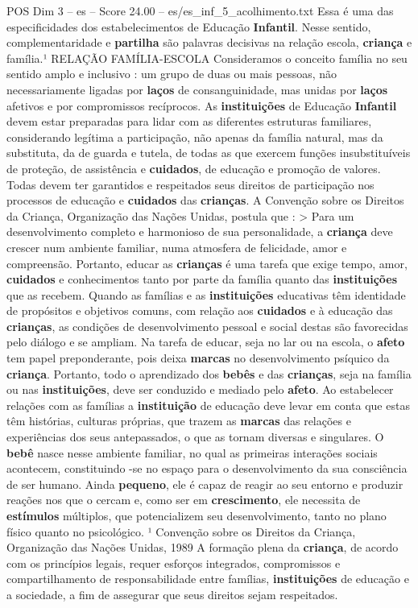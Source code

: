 \begin{textsample}{POS Dim 3 – es – Score 24.00 – es/es\_inf\_5\_acolhimento.txt}
Essa é uma das especificidades dos estabelecimentos de Educação \textbf{Infantil}.
Nesse sentido, complementaridade e \textbf{partilha} são palavras decisivas na relação escola, \textbf{criança} e família.¹ RELAÇÃO FAMÍLIA-ESCOLA Consideramos o conceito família no seu sentido amplo e inclusivo : um grupo de duas ou mais pessoas, não necessariamente ligadas por \textbf{laços} de consanguinidade, mas unidas por \textbf{laços} afetivos e por compromissos recíprocos.
As \textbf{instituições} de Educação \textbf{Infantil} devem estar preparadas para lidar com as diferentes estruturas familiares, considerando legítima a participação, não apenas da família natural, mas da substituta, da de guarda e tutela, de todas as que exercem funções insubstituíveis de proteção, de assistência e \textbf{cuidados}, de educação e promoção de valores.
Todas devem ter garantidos e respeitados seus direitos de participação nos processos de educação e \textbf{cuidados} das \textbf{crianças}.
A Convenção sobre os Direitos da Criança, Organização das Nações Unidas, postula que : > Para um desenvolvimento completo e harmonioso de sua personalidade, a \textbf{criança} deve crescer num ambiente familiar, numa atmosfera de felicidade, amor e compreensão.
Portanto, educar as \textbf{crianças} é uma tarefa que exige tempo, amor, \textbf{cuidados} e conhecimentos tanto por parte da família quanto das \textbf{instituições} que as recebem.
Quando as famílias e as \textbf{instituições} educativas têm identidade de propósitos e objetivos comuns, com relação aos \textbf{cuidados} e à educação das \textbf{crianças}, as condições de desenvolvimento pessoal e social destas são favorecidas pelo diálogo e se ampliam.
Na tarefa de educar, seja no lar ou na escola, o \textbf{afeto} tem papel preponderante, pois deixa \textbf{marcas} no desenvolvimento psíquico da \textbf{criança}.
Portanto, todo o aprendizado dos \textbf{bebês} e das \textbf{crianças}, seja na família ou nas \textbf{instituições}, deve ser conduzido e mediado pelo \textbf{afeto}.
Ao estabelecer relações com as famílias a \textbf{instituição} de educação deve levar em conta que estas têm histórias, culturas próprias, que trazem as \textbf{marcas} das relações e experiências dos seus antepassados, o que as tornam diversas e singulares.
O \textbf{bebê} nasce nesse ambiente familiar, no qual as primeiras interações sociais acontecem, constituindo -se no espaço para o desenvolvimento da sua consciência de ser humano.
Ainda \textbf{pequeno}, ele é capaz de reagir ao seu entorno e produzir reações nos que o cercam e, como ser em \textbf{crescimento}, ele necessita de \textbf{estímulos} múltiplos, que potencializem seu desenvolvimento, tanto no plano físico quanto no psicológico. ¹ Convenção sobre os Direitos da Criança, Organização das Nações Unidas, 1989 A formação plena da \textbf{criança}, de acordo com os princípios legais, requer esforços integrados, compromissos e compartilhamento de responsabilidade entre famílias, \textbf{instituições} de educação e a sociedade, a fim de assegurar que seus direitos sejam respeitados.

\end{textsample}
